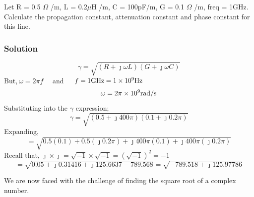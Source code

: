 \begin{exmp}
Let R = 0.5 $\Omega$ /m, L = 0.2$\mu$H /m, C = 100pF/m, G = 0.1 $\Omega$ /m, freq = 1GHz. Calculate the propagation constant, attenuation constant and phase constant for this line.

\subsubsection*{Solution}
\[ \gamma = \sqrt{(R+\jmath\omega L)(G + \jmath\omega C)}\]
But,$ \ \omega = 2\pi f\quad$ and $\quad f = 1\textnormal{GHz} = 1 \times 10^9 \textnormal{Hz} $ 
\[\omega = 2\pi \times 10^9\textnormal{rad/s}\]
Substituting into the $ \gamma $ expression;
\[\gamma = \sqrt{(0.5 + \jmath 400\pi)(0.1 + \jmath 0.2\pi)}\]
Expanding,
\[ = \sqrt{0.5(0.1) + 0.5(\jmath 0.2\pi) + \jmath 400\pi(0.1) + \jmath 400\pi(\jmath 0.2\pi)}\]
Recall  that, $ \jmath \times \jmath = \sqrt{-1} \times \sqrt{-1} = (\sqrt{-1})^2 = -1 $
\begin{dmath*}
=\sqrt{0.05 + \jmath 0.31416 +\jmath 125.6637 - 789.568}
= \sqrt{-789.518 + \jmath 125.97786}
\end{dmath*}

We are now faced with the challenge of finding the square root of a complex number.


\end{exmp}
